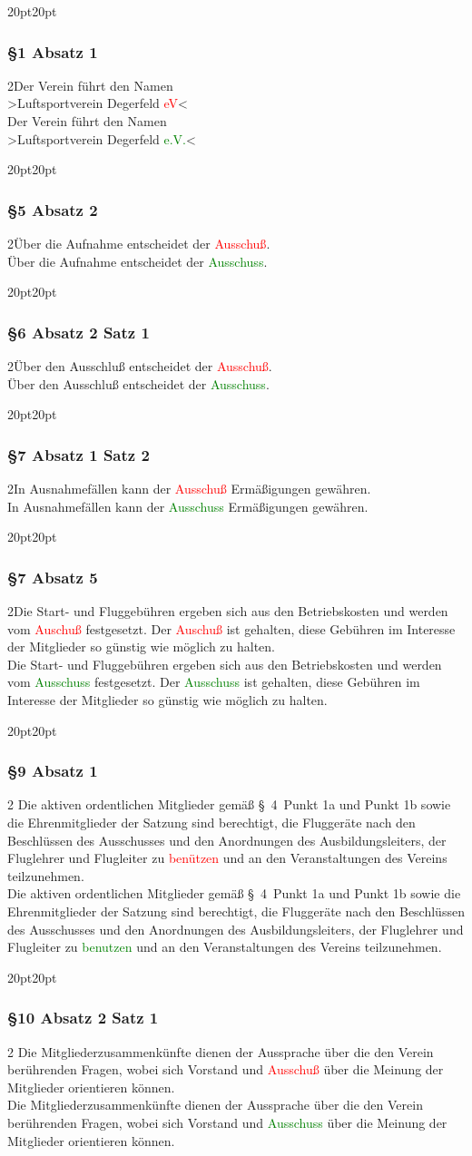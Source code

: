\documentclass[10pt,a4paper,parskip=half]{scrartcl}
\newcommand{\new}[1]{\textcolor{Green}{#1}}
\newcommand{\old}[1]{\textcolor{Red}{#1}}
\newcommand{\change}[1]{
  \begin{adjustwidth}{20pt}{20pt}
    #1
  \end{adjustwidth}
}
\newcommand{\compare}[3]{\change{\subsubsection*{#1}\begin{multicols}{2}#2\columnbreak\\#3\end{multicols}}}
\begin{document}
\compare{§1 Absatz 1}
{Der Verein führt den Namen\\>Luftsportverein Degerfeld \old{eV}<}
{Der Verein führt den Namen\\>Luftsportverein Degerfeld \new{e.V.}<}

\compare{§5 Absatz 2}{Über die Aufnahme entscheidet der \old{Ausschuß}.}{Über die Aufnahme entscheidet der \new{Ausschuss}.}

\compare{§6 Absatz 2 Satz 1}
{Über den Ausschluß entscheidet der \old{Ausschuß}.}
{Über den Ausschluß entscheidet der \new{Ausschuss}.}

\compare{§7 Absatz 1 Satz 2}
{In Ausnahmefällen kann der \old{Ausschuß} Ermäßigungen gewähren.}
{In Ausnahmefällen kann der \new{Ausschuss} Ermäßigungen gewähren.}

\compare{§7 Absatz 5}
{Die Start- und Fluggebühren ergeben sich aus den Betriebskosten und werden vom \old{Auschuß} festgesetzt.
  Der \old{Auschuß} ist gehalten,
  diese Gebühren im Interesse der Mitglieder so günstig wie möglich zu halten.}
{Die Start- und Fluggebühren ergeben sich aus den Betriebskosten und werden vom \new{Ausschuss} festgesetzt.
  Der \new{Ausschuss} ist gehalten,
  diese Gebühren im Interesse der Mitglieder so günstig wie möglich zu halten.}

\compare{§9 Absatz 1}{
  Die aktiven ordentlichen Mitglieder gemäß §~4~Punkt 1a und Punkt 1b
  sowie die Ehrenmitglieder der Satzung sind berechtigt,
  die Fluggeräte nach den Beschlüssen des Ausschusses und den Anordnungen des Ausbildungsleiters,
  der Fluglehrer und Flugleiter zu \old{benützen} und an den Veranstaltungen des Vereins teilzunehmen.
}{
  Die aktiven ordentlichen Mitglieder gemäß §~4~Punkt 1a und Punkt 1b
  sowie die Ehrenmitglieder der Satzung sind berechtigt,
  die Fluggeräte nach den Beschlüssen des Ausschusses und den Anordnungen des Ausbildungsleiters,
  der Fluglehrer und Flugleiter zu \new{benutzen} und an den Veranstaltungen des Vereins teilzunehmen.
}

\compare{§10 Absatz 2 Satz 1}{
  Die Mitgliederzusammenkünfte dienen der Aussprache über die den Verein berührenden Fragen,
  wobei sich Vorstand und \old{Ausschuß} über die Meinung der Mitglieder orientieren können.
}{
  Die Mitgliederzusammenkünfte dienen der Aussprache über die den Verein berührenden Fragen,
  wobei sich Vorstand und \new{Ausschuss} über die Meinung der Mitglieder orientieren können.
}
\end{document}
